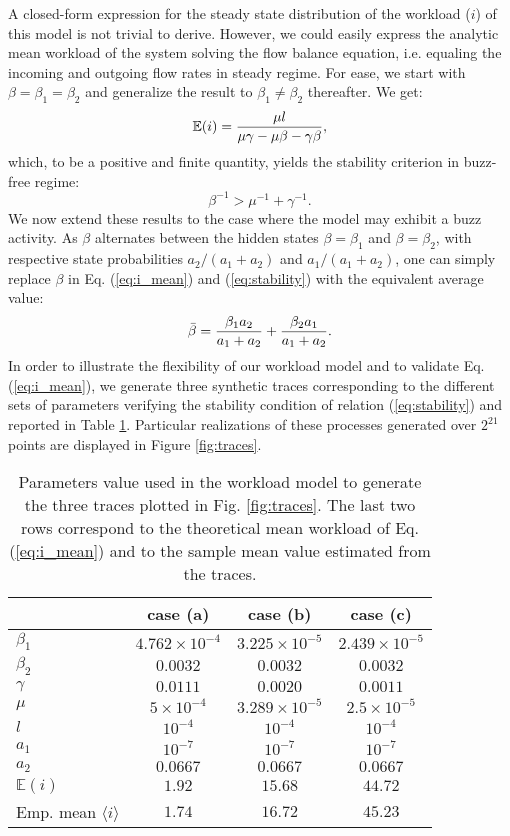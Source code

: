 \documentclass[twoside]{article}
\newcommand{\paulo}[2]{#2}
\newcommand{\roy}[2]{#2}
\begin{document}
\paulo{}{A closed-form expression for the steady state distribution of the workload ($i$) of this model \roy{}{is not trivial to derive}. However, we could easily express the analytic mean workload of the system solving the flow balance equation, i.e. equaling the incoming and outgoing flow rates in steady regime. For ease, we start with $\beta = \beta_1 = \beta_2$  and generalize the result to $\beta_1\not= \beta_2$ thereafter. We get: 
\begin{equation}
\mathbb{E}(i) = {\mu l \over {\mu \gamma - \mu \beta - \gamma \beta}},
\label{eq:i_mean}
\end{equation}
which, to be a positive and finite quantity, yields the stability criterion in buzz-free regime:
\begin{equation}
{\beta}^{-1} > {\mu}^{-1} + {\gamma}^{-1}. 
\label{eq:stability}
\end{equation}
We now extend these results to the case where the model may exhibit a buzz activity. As $\beta$ alternates between the hidden states $\beta=\beta_1$ and $\beta=\beta_2$, \roy{}{with respective state probabilities} $a_2/(a_1+a_2)$ and $a_1/(a_1+a_2)$, one can simply replace $\beta$ in Eq. (\ref{eq:i_mean}) and (\ref{eq:stability}) with the equivalent average  value: 
\begin{equation}
\bar{\beta} =  {{\beta_{1} a_2} \over {a_1 + a_2}} + {{\beta_{2} a_1} \over {a_1 + a_2}}.
\end{equation}
In order to illustrate the flexibility of our workload model and to validate Eq. (\ref{eq:i_mean}), we generate three synthetic traces  corresponding to the different sets of parameters verifying the stability condition of relation (\ref{eq:stability}) and reported in Table \ref{table1}. Particular realizations of these processes generated over $2^{21}$ points are displayed in  Figure \ref{fig:traces}. }
\begin{table}[h]
\centering
\caption{Parameters value used in the workload model to generate the three  traces plotted in Fig. \ref{fig:traces}. The last two rows correspond to the theoretical mean workload of Eq. (\ref{eq:i_mean}) and to the sample mean value estimated from the traces.}
\begin{tabular}{lccc}
\hline
   & case (a) & case (b) & case (c) \\ \hline
$\beta_1$ & $4.762\times10^{-4}$ & $3.225\times10^{-5}$ & $2.439\times10^{-5}$ \\ 
$\beta_2$ & $0.0032$ & $0.0032$ & $0.0032$ \\ 
$\gamma$ & $0.0111$ & $0.0020$ & $ 0.0011$ \\ 
$\mu$ & $5\times10^{-4}$ & $3.289\times10^{-5}$ & $2.5\times10^{-5}$\\
$l$ & $10^{-4}$ & $10^{-4}$ & $10^{-4}$\\
$a_1$ & $10^{-7}$ & $10^{-7}$ & $10^{-7}$\\
$a_2$ & $0.0667$ & $0.0667$ & $0.0667$ \\[1mm] \hline
$\mathbb{E}(i)$ & $1.92$ & $15.68$ & $44.72$ \\ 
Emp. mean $\langle i\rangle$ & $1.74$ & $16.72$ & $45.23$ \\
\hline
\end{tabular}
\label{table1}
\end{table}
\end{document}
